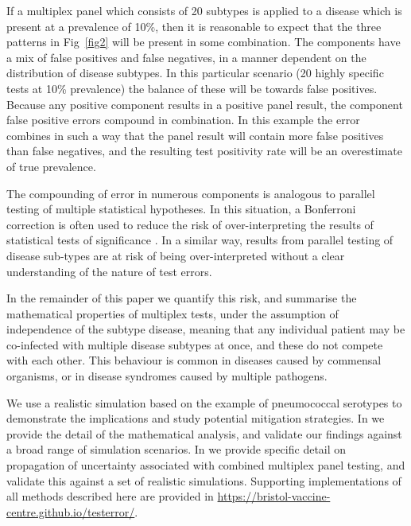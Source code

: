 \documentclass[10pt,letterpaper]{article}
\providecommand{\DIFaddtex}[1]{{\protect\color{blue}\uwave{#1}}} %
\providecommand{\DIFaddbegin}{} %
\providecommand{\DIFaddend}{} %
\providecommand{\DIFdelbegin}{} %
\providecommand{\DIFdelend}{} %
\providecommand{\DIFadd}[1]{\texorpdfstring{\DIFaddtex{#1}}{#1}} %
\newcommand{\DIFscaledelfig}{0.5}
\newlength{\DIFdelgraphicswidth} %
\newlength{\DIFdelgraphicsheight} %
\newcommand{\DIFaddincludegraphics}[2][]{{\color{blue}\fbox{\DIFOincludegraphics[#1]{#2}}}} %
\newcommand{\DIFdelincludegraphics}[2][]{%
\sbox{\DIFdelgraphicsbox}{\DIFOincludegraphics[#1]{#2}}%
\settoboxwidth{\DIFdelgraphicswidth}{\DIFdelgraphicsbox} %
\settoboxtotalheight{\DIFdelgraphicsheight}{\DIFdelgraphicsbox} %
\scalebox{\DIFscaledelfig}{%
\parbox[b]{\DIFdelgraphicswidth}{\usebox{\DIFdelgraphicsbox}\\[-\baselineskip] \rule{\DIFdelgraphicswidth}{0em}}\llap{\resizebox{\DIFdelgraphicswidth}{\DIFdelgraphicsheight}{%
\setlength{\unitlength}{\DIFdelgraphicswidth}%
\begin{picture}(1,1)%
\thicklines\linethickness{2pt} %
{\color[rgb]{1,0,0}\put(0,0){\framebox(1,1){}}}%
{\color[rgb]{1,0,0}\put(0,0){\line( 1,1){1}}}%
{\color[rgb]{1,0,0}\put(0,1){\line(1,-1){1}}}%
\end{picture}%
}\hspace*{3pt}}} %
} %
\DeclareRobustCommand{\DIFaddbegin}{\DIFOaddbegin \let\includegraphics\DIFaddincludegraphics} %
\DeclareRobustCommand{\DIFaddend}{\DIFOaddend \let\includegraphics\DIFOincludegraphics} %
\DeclareRobustCommand{\DIFdelbegin}{\DIFOdelbegin \let\includegraphics\DIFdelincludegraphics} %
\DeclareRobustCommand{\DIFdelend}{\DIFOaddend \let\includegraphics\DIFOincludegraphics} %
\begin{document}
If a multiplex panel which consists of 20 subtypes is applied to a disease which is present at a prevalence of 10\%, then it is reasonable to expect that the three patterns in Fig~\ref{fig2} will be present in some combination. The components have a mix of false positives and false negatives, in a manner dependent on the distribution of disease subtypes. In this particular scenario (20 highly specific tests at 10\% prevalence) the balance of these will be towards false positives. Because any positive component results in a positive panel result, the component false positive errors compound in combination. In this example the error combines in such a way that the panel result will contain more false positives than false negatives, and the resulting test positivity rate will be an overestimate of true prevalence.

The compounding of error in numerous components is analogous to parallel testing of multiple statistical hypotheses. In this situation, a Bonferroni correction is often used to reduce the risk of over-interpreting the results of statistical tests of significance \cite{shaffer1995}. In a similar way, results from parallel testing of disease sub-types are at risk of being over-interpreted without a clear understanding of the nature of test errors.

In the remainder of this paper we quantify this risk, and summarise the mathematical properties of multiplex tests, under the assumption of independence of the subtype disease, meaning that any individual patient may be co-infected with multiple disease subtypes at once, and these do not compete with each other. This behaviour is common in diseases caused by commensal organisms, or in disease syndromes caused by multiple pathogens.

We use a realistic simulation based on the example of pneumococcal serotypes to demonstrate the implications and study potential mitigation strategies. In  we provide the detail of the mathematical analysis, and validate our findings against a broad range of simulation scenarios. In  we provide specific detail on propagation of uncertainty associated with combined multiplex panel testing, and validate this against a set of realistic simulations. Supporting implementations of all methods described here are provided in \DIFdelbegin %
\DIFdelend \DIFaddbegin \DIFadd{the associated R package ''testerror`` (}\url{https://bristol-vaccine-centre.github.io/testerror/}\DIFadd{)}\DIFaddend .
\end{document}
